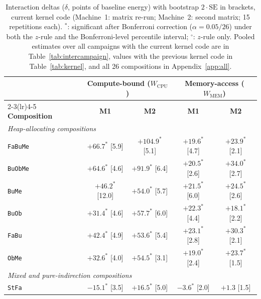 \begin{table}[t]
\caption{Interaction deltas ($\delta$, points of baseline energy) with bootstrap $2\cdot\mathrm{SE}$ in brackets, current kernel code (Machine~1: matrix re-run; Machine~2: second matrix; 15 repetitions each). $^{\ast}$: significant after Bonferroni correction ($\alpha = 0.05/26$) under both the $z$-rule and the Bonferroni-level percentile interval; $^{\circ}$: $z$-rule only. Pooled estimates over all campaigns with the current kernel code are in Table~\ref{tab:intercampaign}, values with the previous kernel code in Table~\ref{tab:kernel}, and all 26 compositions in Appendix~\ref{app:all}.}
\label{tab:results_delta}
\centering
\small
\begin{tabular}{lcccc}
\toprule
& \multicolumn{2}{c}{\textbf{Compute-bound ($W_{\text{CPU}}$)}} & \multicolumn{2}{c}{\textbf{Memory-access ($W_{\text{MEM}}$)}}\\
\cmidrule(lr){2-3}\cmidrule(lr){4-5}
\textbf{Composition} & \textbf{M1} & \textbf{M2} & \textbf{M1} & \textbf{M2}\\
\midrule
\multicolumn{5}{l}{\emph{Heap-allocating compositions}}\\
\texttt{FaBuMe} & $+66.7^{\ast}$ {\scriptsize[5.9]} & $+104.9^{\ast}$ {\scriptsize[5.1]} & $+19.6^{\ast}$ {\scriptsize[4.7]} & $+23.9^{\ast}$ {\scriptsize[2.1]}\\
\texttt{BuObMe} & $+64.6^{\ast}$ {\scriptsize[4.6]} & $+91.9^{\ast}$ {\scriptsize[6.4]} & $+20.5^{\ast}$ {\scriptsize[2.6]} & $+34.0^{\ast}$ {\scriptsize[2.7]}\\
\texttt{BuMe} & $+46.2^{\ast}$ {\scriptsize[12.0]} & $+54.0^{\ast}$ {\scriptsize[5.7]} & $+21.5^{\ast}$ {\scriptsize[6.0]} & $+24.5^{\ast}$ {\scriptsize[2.6]}\\
\texttt{BuOb} & $+31.4^{\ast}$ {\scriptsize[4.6]} & $+57.7^{\ast}$ {\scriptsize[6.0]} & $+22.3^{\ast}$ {\scriptsize[4.4]} & $+18.1^{\ast}$ {\scriptsize[2.2]}\\
\texttt{FaBu} & $+42.4^{\ast}$ {\scriptsize[4.9]} & $+53.6^{\ast}$ {\scriptsize[5.4]} & $+23.1^{\ast}$ {\scriptsize[2.8]} & $+30.3^{\ast}$ {\scriptsize[2.1]}\\
\texttt{ObMe} & $+32.6^{\ast}$ {\scriptsize[4.0]} & $+54.5^{\ast}$ {\scriptsize[3.1]} & $+19.0^{\ast}$ {\scriptsize[2.4]} & $+23.7^{\ast}$ {\scriptsize[1.5]}\\
\midrule
\multicolumn{5}{l}{\emph{Mixed and pure-indirection compositions}}\\
\texttt{StFa} & $-15.1^{\ast}$ {\scriptsize[3.5]} & $+16.5^{\ast}$ {\scriptsize[5.0]} & $-3.6^{\ast}$ {\scriptsize[2.0]} & $+1.3$ {\scriptsize[1.5]}\\

\end{tabular}
\end{table}
